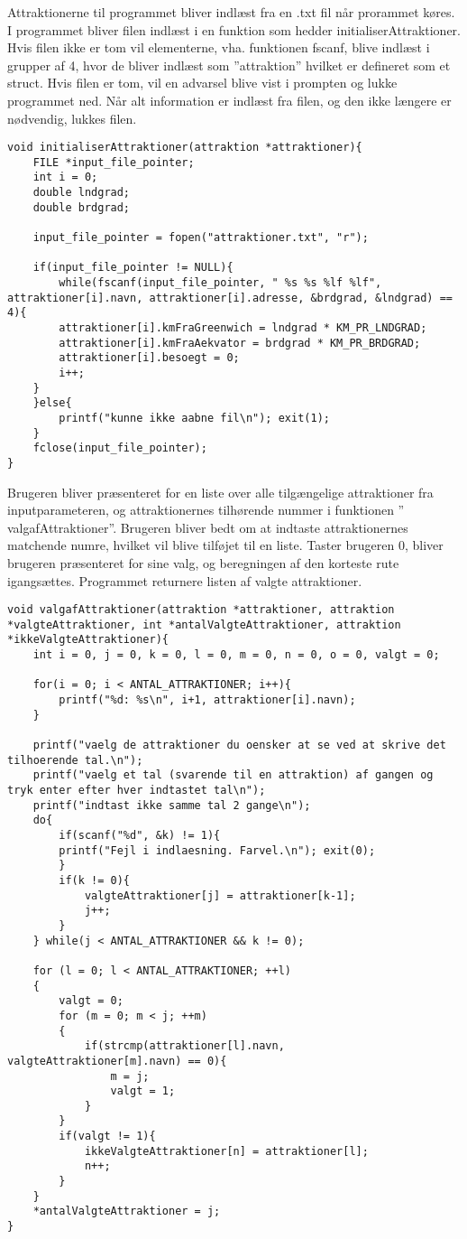 Attraktionerne til programmet bliver indlæst fra en .txt fil når prorammet køres. I programmet bliver filen indlæst i en funktion som hedder initialiserAttraktioner. Hvis filen ikke er tom vil elementerne, vha. funktionen fscanf, blive indlæst i grupper af 4, hvor de bliver indlæst som ”attraktion” hvilket er defineret som et struct. Hvis filen er tom, vil en advarsel blive vist i prompten og lukke programmet ned. Når alt information er indlæst fra filen, og den ikke længere er nødvendig, lukkes filen.

\begin{lstlisting}
void initialiserAttraktioner(attraktion *attraktioner){
	FILE *input_file_pointer;
	int i = 0;
	double lndgrad;
	double brdgrad;
	
	input_file_pointer = fopen("attraktioner.txt", "r");
	
	if(input_file_pointer != NULL){
		while(fscanf(input_file_pointer, " %s %s %lf %lf", attraktioner[i].navn, attraktioner[i].adresse, &brdgrad, &lndgrad) == 4){
		attraktioner[i].kmFraGreenwich = lndgrad * KM_PR_LNDGRAD;
		attraktioner[i].kmFraAekvator = brdgrad * KM_PR_BRDGRAD;
		attraktioner[i].besoegt = 0;
		i++;
	}
	}else{
		printf("kunne ikke aabne fil\n"); exit(1);
	}
	fclose(input_file_pointer);
} 
\end{lstlisting}

Brugeren bliver præsenteret for en liste over alle tilgængelige attraktioner fra inputparameteren, og attraktionernes tilhørende nummer i funktionen ” valgafAttraktioner”. Brugeren bliver bedt om at indtaste attraktionernes matchende numre, hvilket vil blive tilføjet til en liste. Taster brugeren 0, bliver brugeren præsenteret for sine valg, og beregningen af den korteste rute igangsættes. Programmet returnere listen af valgte attraktioner.

\begin{lstlisting}
void valgafAttraktioner(attraktion *attraktioner, attraktion *valgteAttraktioner, int *antalValgteAttraktioner, attraktion *ikkeValgteAttraktioner){
	int i = 0, j = 0, k = 0, l = 0, m = 0, n = 0, o = 0, valgt = 0;
	
	for(i = 0; i < ANTAL_ATTRAKTIONER; i++){
		printf("%d: %s\n", i+1, attraktioner[i].navn);
	}
	
	printf("vaelg de attraktioner du oensker at se ved at skrive det tilhoerende tal.\n");
	printf("vaelg et tal (svarende til en attraktion) af gangen og tryk enter efter hver indtastet tal\n");
	printf("indtast ikke samme tal 2 gange\n");
	do{
		if(scanf("%d", &k) != 1){
		printf("Fejl i indlaesning. Farvel.\n"); exit(0);
		}
		if(k != 0){
			valgteAttraktioner[j] = attraktioner[k-1];
			j++;
		}
	} while(j < ANTAL_ATTRAKTIONER && k != 0);
	
	for (l = 0; l < ANTAL_ATTRAKTIONER; ++l)
	{
		valgt = 0;
		for (m = 0; m < j; ++m)
		{
			if(strcmp(attraktioner[l].navn, valgteAttraktioner[m].navn) == 0){
				m = j;
				valgt = 1;
			}	
		}
		if(valgt != 1){
			ikkeValgteAttraktioner[n] = attraktioner[l];
			n++;
		}
	}
	*antalValgteAttraktioner = j;
}
\end{lstlisting}
	
